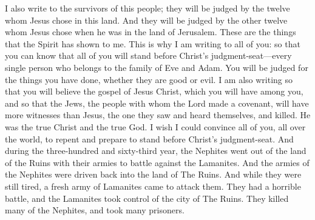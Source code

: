 I also write to the survivors of this people; they will be judged by the twelve whom Jesus chose in this land. And they will be judged by the other twelve whom Jesus chose when he was in the land of Jerusalem.
\bverse \iffalse And these things doth the Spirit manifest unto me; therefore I write unto you all. And for this cause I write unto you, that ye may know that ye must all stand before the judgment-seat of Christ, yea, every soul who belongs to the whole human family of Adam; and ye must stand to be judged of your works, whether they be good or evil; \fi
These are the things that the Spirit has shown to me. This is why I am writing to all of you: so that you can know that all of you will stand before Christ's judgment-seat---every single person who belongs to the family of Eve and Adam. You will be judged for the things you have done, whether they are good or evil.
\bverse \iffalse And also that ye may believe the gospel of Jesus Christ, which ye shall have among you; and also that the Jews, the covenant people of the Lord, shall have other witness besides him whom they saw and heard, that Jesus, whom they slew, was the very Christ and the very God. \fi
I am also writing so that you will believe the gospel of Jesus Christ, which you will have among you, and so that the Jews, the people with whom the Lord made a covenant, will have more witnesses than Jesus, the one they saw and heard themselves, and killed. He was the true Christ and the true God.
\bverse \iffalse And I would that I could persuade all ye ends of the earth to repent and prepare to stand before the judgment-seat of Christ. \fi
I wish I could convince all of you, all over the world, to repent and prepare to stand before Christ's judgment-seat.
\bchapter
\bverse \iffalse And now it came to pass that in the three hundred and sixty and third year the Nephites did go up with their armies to battle against the Lamanites, out of the land Desolation. \fi
And during the three-hundred and sixty-third year, the Nephites went out of the land of the Ruins with their armies to battle against the Lamanites.
\bverse \iffalse And it came to pass that the armies of the Nephites were driven back again to the land of Desolation. And while they were yet weary, a fresh army of the Lamanites did come upon them; and they had a sore battle, insomuch that the Lamanites did take possession of the city Desolation, and did slay many of the Nephites, and did take many prisoners. \fi
And the armies of the Nephites were driven back into the land of The Ruins. And while they were still tired, a fresh army of Lamanites came to attack them. They had a horrible battle, and the Lamanites took control of the city of The Ruins. They killed many of the Nephites, and took many prisoners.

